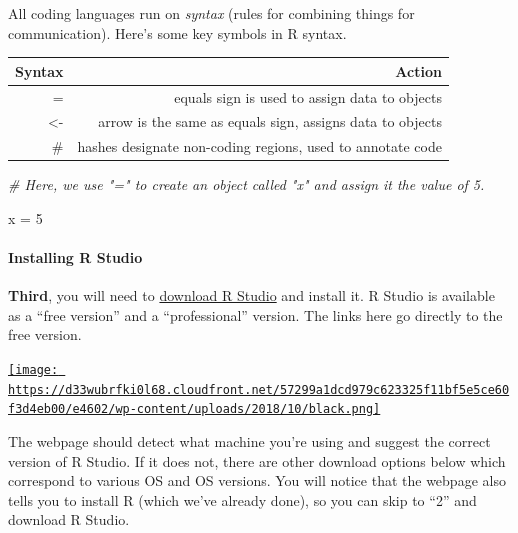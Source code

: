 \documentclass[
]{article}
\newenvironment{Shaded}{\begin{snugshade}}{\end{snugshade}}
\newcommand{\CommentTok}[1]{\textcolor[rgb]{0.56,0.35,0.01}{\textit{#1}}}
\newcommand{\DecValTok}[1]{\textcolor[rgb]{0.00,0.00,0.81}{#1}}
\newcommand{\NormalTok}[1]{#1}
\newcommand{\OtherTok}[1]{\textcolor[rgb]{0.56,0.35,0.01}{#1}}
\begin{document}
All coding languages run on \emph{syntax} (rules for combining things
for communication). Here's some key symbols in R syntax.

\begin{longtable}[]{@{}rr@{}}
\toprule()
Syntax & Action \\
\midrule()
\endhead
= & equals sign is used to assign data to objects \\
\textless- & arrow is the same as equals sign, assigns data to
objects \\
\# & hashes designate non-coding regions, used to annotate code \\
\bottomrule()
\end{longtable}

\begin{Shaded}
\begin{Highlighting}[]
\CommentTok{\# Here, we use "=" to create an object called "x" and assign it the value of 5.}

\NormalTok{x }\OtherTok{=} \DecValTok{5}
\end{Highlighting}
\end{Shaded}

\hypertarget{installing-r-studio}{%
\paragraph{Installing R Studio}\label{installing-r-studio}}

\textbf{Third}, you will need to
\href{https://posit.co/download/rstudio-desktop/}{download R Studio} and
install it. R Studio is available as a ``free version'' and a
``professional'' version. The links here go directly to the free
version.

\href{https://posit.co/downloads/}{\texttt{[image: https://d33wubrfki0l68.cloudfront.net/57299a1dcd979c623325f11bf5e5ce60f3d4eb00/e4602/wp-content/uploads/2018/10/black.png]}}

The webpage should detect what machine you're using and suggest the
correct version of R Studio. If it does not, there are other download
options below which correspond to various OS and OS versions. You will
notice that the webpage also tells you to install R (which we've already
done), so you can skip to ``2'' and download R Studio.
\end{document}
